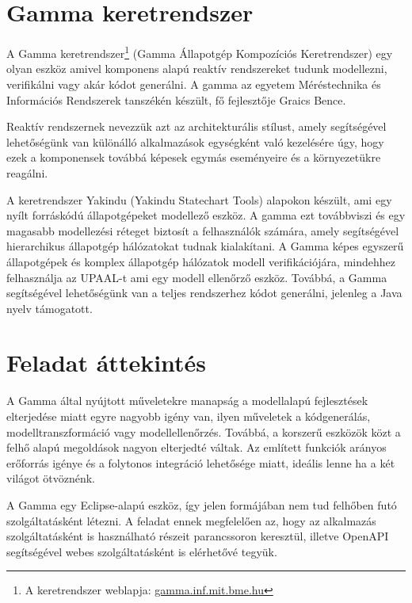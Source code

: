 \section{Gamma keretrendszer}
A Gamma keretrendszer\footnote{A keretrendszer weblapja: \url{gamma.inf.mit.bme.hu}} (Gamma Állapotgép Kompozíciós Keretrendszer) egy olyan eszköz amivel komponens alapú reaktív rendszereket tudunk modellezni, verifikálni vagy akár kódot generálni. A gamma az egyetem Méréstechnika és Információs Rendszerek tanszékén készült, fő fejlesztője Graics Bence.

Reaktív rendszernek nevezzük azt az architekturális stílust, amely segítségével lehetőségünk van különálló alkalmazások egységként való kezelésére úgy, hogy ezek a komponensek továbbá képesek egymás eseményeire és a környezetükre reagálni.

A keretrendszer Yakindu (Yakindu Statechart Tools) alapokon készült, ami egy nyílt forráskódú állapotgépeket modellező eszköz. A gamma ezt továbbviszi és egy magasabb modellezési réteget biztosít a felhasználók számára, amely segítségével hierarchikus állapotgép hálózatokat tudnak kialakítani. A Gamma képes egyszerű állapotgépek és komplex állapotgép hálózatok modell verifikációjára, mindehhez felhasználja az UPAAL-t ami egy modell ellenőrző eszköz. Továbbá, a Gamma segítségével lehetőségünk van a teljes rendszerhez kódot generálni, jelenleg a Java nyelv támogatott.

\section{Feladat áttekintés}

A Gamma által nyújtott műveletekre manapság a modellalapú fejlesztések elterjedése miatt egyre nagyobb igény van, ilyen műveletek a kódgenerálás, modelltranszformáció vagy modellellenőrzés. Továbbá, a korszerű eszközök közt a felhő alapú megoldások nagyon elterjedté váltak. Az említett funkciók arányos erőforrás igénye és a folytonos integráció lehetősége miatt, ideális lenne ha a két világot ötvöznénk.


A Gamma egy Eclipse-alapú eszköz, így jelen formájában nem tud felhőben futó szolgáltatásként létezni. A feladat ennek megfelelően az, hogy az alkalmazás szolgáltatásként is használható részeit parancssoron keresztül, illetve OpenAPI segítségével webes szolgáltatásként is elérhetővé tegyük.

